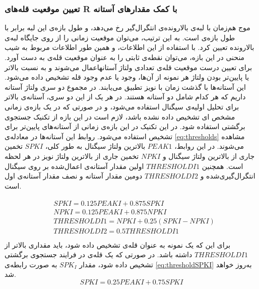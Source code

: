 \subsubsection{تعیین موقعیت قله‌های R با کمک مقدارهای آستانه}

موج  هم‌زمان با لبه‌ی بالارونده‌ی انتگرال‌گیر رخ می‌دهد، و طول بازه‌ی این لبه برابر با طول بازه‌ی  است. به این ترتیب، می‌توان موقعیت زمانی  را از روی جایگاه لبه‌ی بالارونده تعیین کرد. با استفاده از این اطلاعات، و همین طور اطلاعات مربوط به شیب منحنی  در این بازه، می‌توان نقطه‌ی ثابتی را به عنوان موقعیت قله‌ی  به دست آورد.
برای تعیین درست موقعیت قله‌ی  تعدادی ولتاژ آستانهاعمال می‌شوند و به نسبت بالاتر یا پایین‌تر بودن ولتاژ هر نمونه از آن‌ها، وجود یا عدم وجود قله تشخیص داده می‌شود. این آستانه‌ها با گذشت زمان با نویز تطبیق می‌یابند. در مجموع دو سری ولتاژ آستانه داریم که هر کدام شامل دو آستانه هستند. در هر یک از این دو سری، آستانه‌ی بالاتر برای تحلیل اولیه‌ی سیگنال استفاده می‌شود، و در صورتی که در یک بازه‌ی زمانی مشخص  ای تشخیص داده نشده باشد، لازم است در این بازه از تکنیک جستجوی برگشتی استفاده شود. در این تکنیک در این بازه‌ی زمانی  از آستانه‌های پایین‌تر برای تشخیص  استفاده می‌شود. روابط این آستانه‌ها در معادله‌ی \ref{eq:thresholds} مشاهده می‌شوند. در این روابط، $PEAK1$ بالاترین ولتاژ سیگنال به طور کلی، $SPKI$ تخمین جاری از بالاترین ولتاژ سیگنال و $NPKI$ تخمین جاری از بالاترین ولتاژ نویز در هر لحظه است. همچنین $THRESHOLD I1$ اولین مقدار آستانه‌ی اعمال‌شده بر روی سیگنال انتگرال‌گیری‌شده و $THRESHOLD I2$ دومین مقدار آستانه و نصف مقدار آستانه‌ی اول است.

\begin{align}
\begin{split}
	& SPKI = 0.125 PEAKI + 0.875 SPKI\\
	& NPKI = 0.125 PEAKI + 0.875 NPKI\\
	& THRESHOLD I1 = NPKI + 0.25(SPKI - NPKI)\\
	& THRESHOLD I2 = 0.5 THRESHOLD I1\\
\end{split}
\label{eq:integrator}
\end{align}
برای این که یک نمونه به عنوان قله‌ی  تشخیص داده شود، باید مقداری بالاتر از $THRESHOLD I1$ داشته باشد. در صورتی که یک قله‌ی  در فرایند جستجوی برگشتی تشخیص داده شود، مقدار $SPK_I$ به صورت رابطه‌ی \ref{eq:thresholdSPKI} به‌روز خواهد شد. 
\begin{equation}
	SPKI = 0.25 PEAKI + 0.75 SPKI
\label{eq:thresholdSPKI}
\end{equation}

